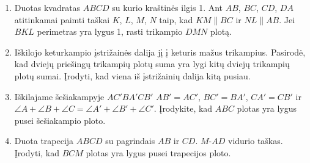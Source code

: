 \begin{enumerate}
\item Duotas kvadratas $ABCD$ su kurio kraštinės ilgis 1.
  Ant $AB$, $BC$, $CD$, $DA$ atitinkamai paimti taškai $K$,
  $L$, $M$, $N$ taip, kad $KM\parallel{BC}$ ir
  $NL\parallel{AB}$. Jei $BKL$ perimetras yra lygus 1, rasti
  trikampio $DMN$ plotą.
 
\item Iškilojo keturkampio įstrižainės dalija jį į keturis
  mažus trikampius. Pasirodė, kad dviejų priešingų trikampių
  plotų suma yra lygi kitų dviejų trikampių plotų sumai.
  Įrodyti, kad viena iš įstrižainių dalija kitą pusiau.
\item Iškilajame šešiakampyje $AC'BA'CB'$  $AB'=AC'$,
  $BC'=BA'$, $CA'=CB'$ ir $\angle A+\angle B+\angle C=\angle
  A'+\angle B'+\angle C'$. Įrodykite, kad $ABC$ plotas yra
  lygus pusei šešiakampio ploto. 

\item Duota trapecija $ABCD$ su pagrindais $AB$ ir $CD$.
  $M$-$AD$ vidurio taškas. Įrodyti, kad $BCM$ plotas yra lygus
  pusei trapecijos ploto.
  

\end{enumerate}
